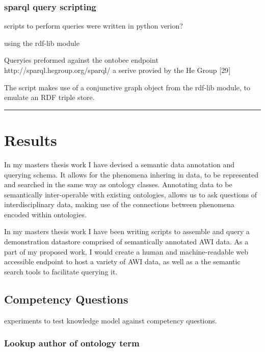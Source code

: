 \documentclass[]{article}
\begin{document}
\hypertarget{sparql-query-scripting}{%
\subsubsection{sparql query scripting}\label{sparql-query-scripting}}

scripts to perform queries were written in python verion?

using the rdf-lib module

Queryies preformed against the ontobee endpoint
http://sparql.hegroup.org/sparql/ a serive provied by the He Group
{[}29{]}

The script makes use of a conjunctive graph object from the rdf-lib
module, to emulate an RDF triple store.

\begin{center}\rule{0.5\linewidth}{\linethickness}\end{center}

\hypertarget{results}{%
\section{Results}\label{results}}

In my masters thesis work I have devised a semantic data annotation and
querying schema. It allows for the phenomena inhering in data, to be
represented and searched in the same way as ontology classes. Annotating
data to be semantically inter-operable with existing ontologies, allows
us to ask questions of interdisciplinary data, making use of the
connections between phenomena encoded within ontologies.

In my masters thesis work I have been writing scripts to assemble and
query a demonstration datastore comprised of semantically annotated AWI
data. As a part of my proposed work, I would create a human and
machine-readable web accessible endpoint to host a variety of AWI data,
as well as a the semantic search tools to facilitate querying it.

\hypertarget{competency-questions-1}{%
\subsection{Competency Questions}\label{competency-questions-1}}

experiments to test knowledge model against competency questions.

\hypertarget{lookup-author-of-ontology-term}{%
\subsubsection{Lookup author of ontology
term}\label{lookup-author-of-ontology-term}}
\end{document}
